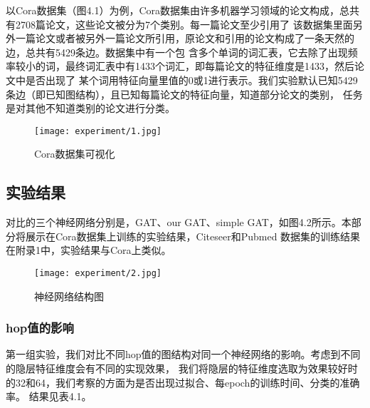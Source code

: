 以Cora数据集（图4.1）为例，Cora数据集由许多机器学习领域的论文构成，总共有2708篇论文，这些论文被分为7个类别。每一篇论文至少引用了
该数据集里面另外一篇论文或者被另外一篇论文所引用，原论文和引用的论文构成了一条天然的边，总共有5429条边。数据集中有一个包
含多个单词的词汇表，它去除了出现频率较小的词，最终词汇表中有1433个词汇，即每篇论文的特征维度是1433，然后论文中是否出现了
某个词用特征向量里值的0或1进行表示。我们实验默认已知5429条边（即已知图结构），且已知每篇论文的特征向量，知道部分论文的类别，
任务是对其他不知道类别的论文进行分类。

\begin{figure}[ht]
    \centering
    \texttt{[image: experiment/1.jpg]}
    \caption{\label{4-1}Cora数据集可视化}
\end{figure}

\subsection{实验结果}
对比的三个神经网络分别是，GAT、our GAT、simple GAT，如图4.2所示。本部分将展示在Cora数据集上训练的实验结果，Citeseer和Pubmed
数据集的训练结果在附录1中，实验结果与Cora上类似。
\begin{figure}[ht]
    \centering
    \texttt{[image: experiment/2.jpg]}
    \caption{\label{4-2}神经网络结构图}
\end{figure}

\subsubsection{hop值的影响}
第一组实验，我们对比不同hop值的图结构对同一个神经网络的影响。考虑到不同的隐层特征维度会有不同的实现效果，
我们将隐层的特征维度选取为效果较好时的32和64，我们考察的方面为是否出现过拟合、每epoch的训练时间、分类的准确率。
结果见表4.1。

